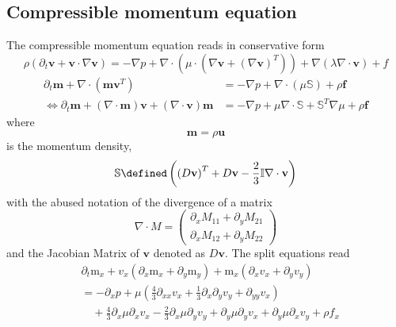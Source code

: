 \subsection{Compressible momentum equation}
\label{sub:Compressible momentum equation}
The compressible momentum equation reads in conservative form
\begin{equation}
  \rho \left(\partial_t \mathbf{v} + \mathbf{v}\cdot \nabla \mathbf{v}\right)=-\nabla p + \nabla\cdot (\mu \cdot(\nabla\mathbf{v} + {(\nabla\mathbf{v})}^T))+\nabla(\lambda\nabla\cdot\mathbf{v}) + f
\end{equation}
\begin{equation}
  \label{eq:compressible NS}
  \begin{aligned}
    \partial_t \mathbf{m} + \nabla \cdot (\mathbf{m}\mathbf{v}^T)
    &= - \nabla p + \nabla \cdot (\mu\mathbb{S}) + \rho \mathbf{f} \\
    \Leftrightarrow\partial_t \mathbf{m} + (\nabla \cdot \mathbf{m})\mathbf{v} + (\nabla \cdot \mathbf{v})\mathbf{m}
    &= - \nabla p + \mu \nabla \cdot \mathbb{S} + \mathbb{S}^T \nabla\mu + \rho \mathbf{f}
  \end{aligned}
\end{equation}
where
\begin{equation}
  \mathbf{m} = \rho \mathbf{u}
\end{equation}
is the momentum density,
\begin{equation}
  \mathbb{S} \defined \left({(D\mathbf{v})}^T + D\mathbf{v} - \frac{2}{3}\mathbb{I}\nabla\cdot\mathbf{v} \right)
\end{equation}
with the abused notation of the divergence of a matrix
\begin{equation}
  \nabla \cdot M =
  \begin{pmatrix}
    \partial_x M_{11} + \partial_y M_{21} \\
    \partial_x M_{12} + \partial_y M_{22}
  \end{pmatrix}
\end{equation}
and the Jacobian Matrix of $\mathbf{v}$ denoted as $D\mathbf{v}$.
The split equations read
\begin{equation}
  \begin{aligned}
    & \partial_t \text{m}_x
    + v_x (\partial_x \text{m}_x + \partial_y \text{m}_y)
    + \text{m}_x (\partial_x v_x + \partial_y v_y)  \\
    & =
     - \partial_x p
     + \mu \left(\frac{4}{3}\partial_{xx}v_x
            + \frac{1}{3}\partial_x\partial_y v_y
            + \partial_{yy} v_x \right) \\
    &\quad + \frac{4}{3}\partial_x \mu \partial_x v_x
    - \frac{2}{3}\partial_x \mu \partial_y v_y
    + \partial_y \mu \partial_y v_x
    + \partial_y \mu \partial_x v_y
    + \rho f_x
  \end{aligned}
\end{equation}
